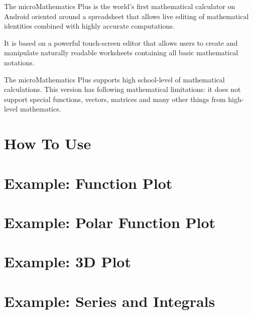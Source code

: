 \documentclass[DIV=calc, paper=a4, fontsize=11pt, twocolumn]{scrartcl}
\begin{document}
\maketitle
\thispagestyle{fancy} %

\begin{bf}
The microMathematics Plus is the world's first mathematical
calculator on Android oriented around a spreadsheet that allows live editing
of mathematical identities combined with highly accurate computations.

It is based on a powerful touch-screen editor that allows users to
create and manipulate naturally readable worksheets containing all basic mathematical
notations.

The microMathematics Plus supports high school-level of mathematical
calculations. This version has following mathematical limitations: it does not
support special functions, vectors, matrices and many other things from
high-level mathematics.
\end{bf}

\section{How To Use}


\section{Example: Function Plot}


\section{Example: Polar Function Plot}


\section{Example: 3D Plot}


\section{Example: Series and Integrals}

\end{document}

